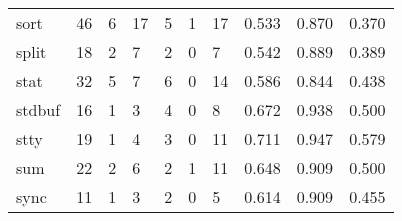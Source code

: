 \begin{longtable}{lp{1.3cm}p{1.3cm}p{1.3cm}p{1.3cm}p{1.3cm}p{1.3cm}p{1.3cm}p{1.3cm}p{1.3cm}}
sort      &                     46 &                                             6 &                                           17 &                                           5 &                                            1 &                                         17 &                                0.533 &                                  0.870 &                                0.370 \\
split     &                     18 &                                             2 &                                            7 &                                           2 &                                            0 &                                          7 &                                0.542 &                                  0.889 &                                0.389 \\
stat      &                     32 &                                             5 &                                            7 &                                           6 &                                            0 &                                         14 &                                0.586 &                                  0.844 &                                0.438 \\
stdbuf    &                     16 &                                             1 &                                            3 &                                           4 &                                            0 &                                          8 &                                0.672 &                                  0.938 &                                0.500 \\
stty      &                     19 &                                             1 &                                            4 &                                           3 &                                            0 &                                         11 &                                0.711 &                                  0.947 &                                0.579 \\
sum       &                     22 &                                             2 &                                            6 &                                           2 &                                            1 &                                         11 &                                0.648 &                                  0.909 &                                0.500 \\
sync      &                     11 &                                             1 &                                            3 &                                           2 &                                            0 &                                          5 &                                0.614 &                                  0.909 &                                0.455 \\

\end{longtable}
